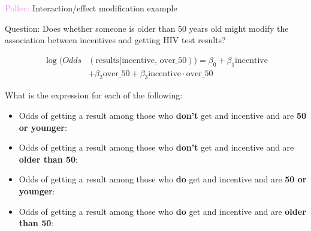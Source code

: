 \documentclass[10pt,t]{beamer}
\begin{document}
\begin{frame}{\textcolor{violet}{Pollev:} Interaction/effect modification example}
	
	\vspace{-5 mm}
	
	Question: Does whether someone is older than 50 years old might modify the association between incentives and getting HIV test results?
	
	
	\vspace{-3 mm}
	
	\color{blue}
	\begin{align*}
	\log(Odds&(\text{results}|\text{incentive, over\_50})) = \beta_0 + \beta_1\text{incentive}\\&+\beta_2\text{over\_50}+\beta_3\text{incentive}\cdot\text{over\_50}
	\end{align*}
	\color{black}
	
	\vspace{-2 mm}
	
	What is the expression for each of the following:
	
	\medskip
	
	\begin{itemize}
		\item Odds of getting a result among those who \textbf{don't} get and incentive and are \textbf{50 or younger}: %
		
		\medskip
		
		\item Odds of getting a result among those who \textbf{don't} get and incentive and are \textbf{older than 50}: %
		
		\medskip
		
		\item Odds of getting a result among those who \textbf{do} get and incentive and are \textbf{50 or younger}: %
		
		\medskip
		
		\item Odds of getting a result among those who \textbf{do} get and incentive and are \textbf{older than 50}: %
		
		
		
	\end{itemize}
	
\end{frame}
\end{document}
